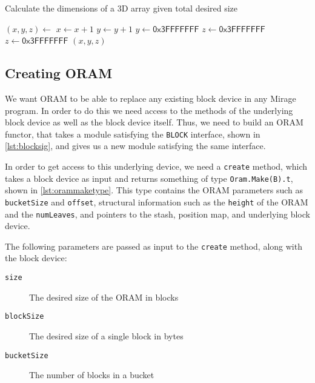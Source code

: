 \documentclass[12pt,a4paper,twoside,openright]{report}
\begin{document}
\begin{algorithm}
\caption{Calculate the dimensions of a 3D array given total desired size}
\label{alg:posmapdims}
\begin{algorithmic}[1]
\vskip 10pt
\vskip 10pt
\vskip 10pt
	\State $(x, y, z) \gets$ 
\vskip 10pt
	\State $x \gets x + 1$
	\State $y \gets y + 1$
\vskip 10pt
		\State $y \gets \mathsf{0x3FFFFFFF}$
		\State $z \gets \mathsf{0x3FFFFFFF}$
		\State $z \gets \mathsf{0x3FFFFFFF}$
	\EndIf
\vskip 10pt
	\State \Return $(x,y,z)$
\vskip 10pt
\EndFunction
\vskip 10pt
\end{algorithmic}
\end{algorithm}

\subsection{Creating ORAM}

We want ORAM to be able to replace any existing block device in any Mirage program. In order to do this we need access to the methods of the underlying block device as well as the block device itself. Thus, we need to build an ORAM functor, that takes a module satisfying the \texttt{BLOCK} interface, shown in \cref{lst:blocksig}, and gives us a new module satisfying the same interface.

In order to get access to this underlying device, we need a \texttt{create} method, which takes a block device as input and returns something of type \texttt{Oram.Make(B).t}, shown in \cref{lst:orammaketype}. This type contains the ORAM parameters such as \texttt{bucketSize} and \texttt{offset}, structural information such as the \texttt{height} of the ORAM and the \texttt{numLeaves}, and pointers to the stash, position map, and underlying block device. 

The following parameters are passed as input to the \texttt{create} method, along with the block device:

\begin{description}
  \item[\texttt{size}] The desired size of the ORAM in blocks
  \item[\texttt{blockSize}] The desired size of a single block in bytes
  \item[\texttt{bucketSize}] The number of blocks in a bucket
\end{description}
\end{document}
